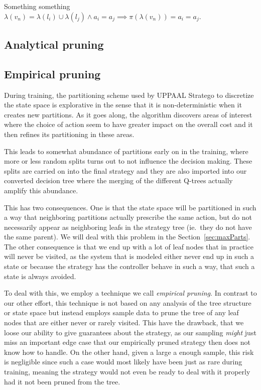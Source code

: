 Something something $\lambda(v_n) = \lambda(l_i) \cup \lambda(l_j) \land a_i =
a_j \implies \pi(\lambda(v_n)) = a_i = a_j$.

\subsection{Analytical pruning}%
\label{sub:anaPrune}

\lipsum[1]


\subsection{Empirical pruning}%
\label{sub:empPrune}

During training, the partitioning scheme used by UPPAAL Stratego to discretize
the state space is explorative in the sense that it is non-deterministic when it
creates new partitions. As it goes along, the algorithm discovers areas of
interest where the choice of action seem to have greater impact on the overall
cost and it then refines its partitioning in these areas.

This leads to somewhat abundance of partitions early on in the training, where
more or less random splits turns out to not influence the decision making. These
splits are carried on into the final strategy and they are also imported into
our converted decision tree where the merging of the different Q-trees actually
amplify this abundance.

This has two consequences. One is that the state space will be partitioned in
such a way that neighboring partitions actually prescribe the same action, but
do not necessarily appear as neighboring leafs in the strategy tree (ie.\ they
do not have the same parent). We will deal with this problem in the
Section~\ref{sec:maxParts}. The other consequence is that we end up with a lot
of leaf nodes that in practice will never be visited, as the system that is
modeled either never end up in such a state or because the strategy has the
controller behave in such a way, that such a state is always avoided.

To deal with this, we employ a technique we call \textit{empirical pruning}. In
contrast to our other effort, this technique is not based on any analysis of the
tree structure or state space but instead employs sample data to prune the tree
of any leaf nodes that are either never or rarely visited. This have the
drawback, that we loose our ability to give guarantees about the strategy, as our
sampling \textit{might} just miss an important edge case that our empirically
pruned strategy then does not know how to handle. On the other hand, given a
large a enough sample, this risk is negligible since such a case would most
likely have been just as rare during training, meaning the strategy would not
even be ready to deal with it properly had it not been pruned from the tree.

